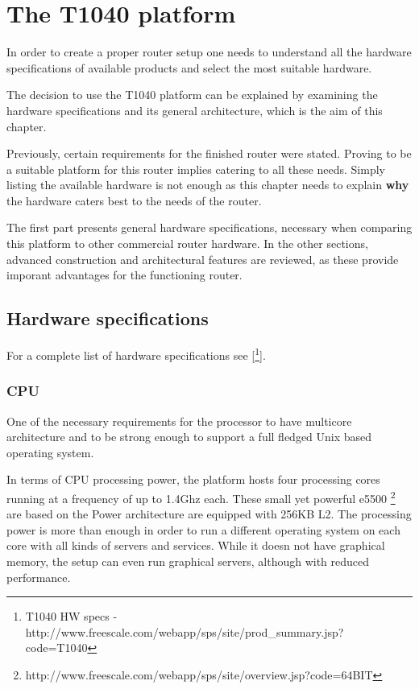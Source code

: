 \chapter{The T1040 platform}
\label{chapter:t1040-platform}

In order to create a proper router setup one needs to understand
all the hardware specifications of available products and select the
most suitable hardware.

The decision to use the T1040 platform can be explained by examining the
hardware specifications and its general architecture, which is the aim of
this chapter.

Previously, certain requirements for the finished router
were stated. Proving to be a suitable platform for this router
implies catering to all these needs. Simply listing the available
hardware is not enough as this chapter needs to explain \textbf{why}
the hardware caters best to the needs of the router.

The first part presents general hardware specifications,
necessary when comparing this platform to other commercial router
hardware. In the other sections, advanced construction and architectural
features are reviewed, as these provide imporant advantages for the 
functioning router.

\section{Hardware specifications}
\label{sec:specs}

For a complete list of hardware specifications see [\footnote{T1040 HW specs -
http://www.freescale.com/webapp/sps/site/prod_summary.jsp?code=T1040}].

\subsection{CPU}
One of the necessary requirements for the processor to have multicore 
architecture and to be strong enough to support a full fledged Unix
based operating system.

In terms of CPU processing power, the platform hosts four processing cores
running at a frequency of up to 1.4Ghz each. These small yet powerful e5500
\footnote{http://www.freescale.com/webapp/sps/site/overview.jsp?code=64BIT}
are based on the Power architecture are equipped with 256KB L2.
The processing power is more than enough in order to run a different operating
system on each core with all kinds of servers and services.
While it doesn not have graphical memory, the setup can even run
graphical servers, although with reduced performance.


